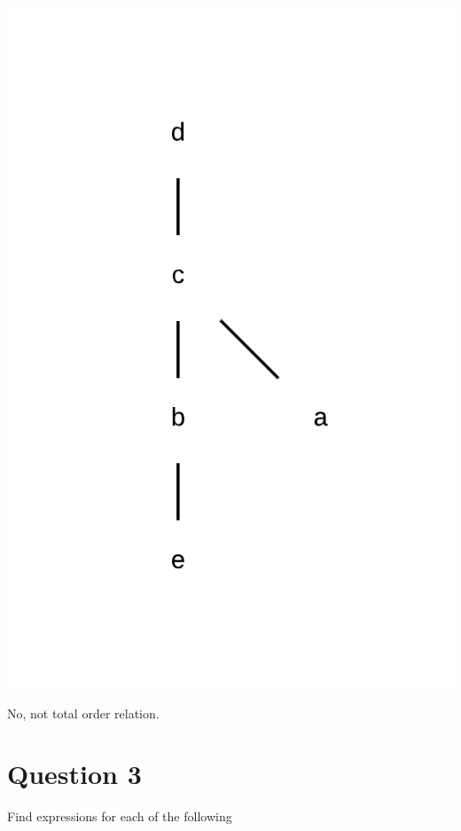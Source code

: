 \documentclass[11pt]{article}
\begin{document}
\begin{center}
    \includegraphics{A7}
\end{center}

No, not total order relation.

\break{}
\section*{Question 3}

Find expressions for each of the following
\end{document}
